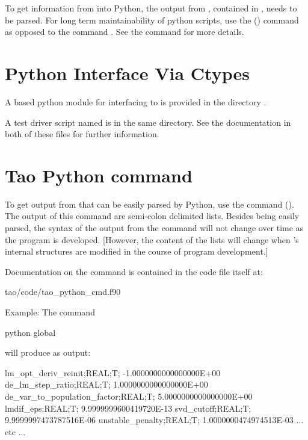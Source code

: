 To get information from \tao into Python, the output from \tao,
contained in , needs to be parsed. For long term
maintainability of python scripts, use the  () command 
as opposed to the  command . See the  command for more details.

\section{Python Interface Via Ctypes}

A  based python module  for interfacing \tao to  is provided in
the directory .

A test driver script named  is in the same directory. See the documentation in both of
these files for further information.

\section{Tao Python command}
\label{s:python.python}

To get output from \tao that can be easily parsed by Python, use the  command
(). The output of this command are semi-colon delimited lists. Besides being easily
parsed, the syntax of the output from the  command will not change over time as the \tao
program is developed. [However, the content of the lists will change when \tao's internal structures
are modified in the course of \tao program development.]

Documentation on the  command is contained in the code file itself at:
\begin{example}
  tao/code/tao_python_cmd.f90
\end{example}

Example: The command
\begin{example}
  python global
\end{example}
will produce as output:
\begin{example}
  lm_opt_deriv_reinit;REAL;T; -1.0000000000000000E+00
  de_lm_step_ratio;REAL;T;  1.0000000000000000E+00
  de_var_to_population_factor;REAL;T;  5.0000000000000000E+00
  lmdif_eps;REAL;T;  9.9999999600419720E-13
  svd_cutoff;REAL;T;  9.9999997473787516E-06
  unstable_penalty;REAL;T;  1.0000000474974513E-03
  ... etc ...
\end{example}

